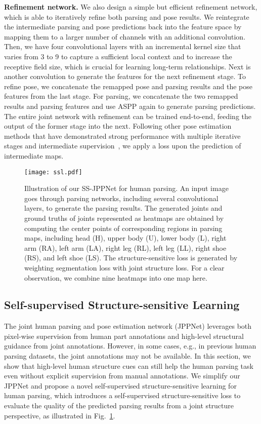\documentclass[10pt,journal,compsoc]{IEEEtran}
\begin{document}
\textbf{Refinement network.}
We also design a simple but efficient refinement network, which is able to iteratively refine both parsing and pose results. We reintegrate the intermediate parsing and pose predictions back into the feature space by mapping them to a larger number of channels with an additional  convolution. Then, we have four convolutional layers with an incremental kernel size that varies from 3 to 9 to capture a sufficient local context and to increase the receptive field size, which is crucial for learning long-term relationships. Next is another  convolution to generate the features for the next refinement stage. To refine pose, we concatenate the remapped pose and parsing results and the pose features from the last stage. For parsing, we concatenate the two remapped results and parsing features and use ASPP again to generate parsing predictions. The entire joint network with refinement can be trained end-to-end, feeding the output of the former stage into the next. Following other pose estimation methods that have demonstrated strong performance with multiple iterative stages and intermediate supervision~\cite{Wei_2016_CVPR,newell2016stacked,carreira2016human}, we apply a loss upon the prediction of intermediate maps.




\begin{figure}[t]
\centering
   \texttt{[image: ssl.pdf]}
\vspace{-7mm}
\caption{Illustration of our SS-JPPNet for human parsing. An input image goes through parsing networks, including several convolutional layers, to generate the parsing results. The generated joints and ground truths of joints represented as heatmaps are obtained by computing the center points of corresponding regions in parsing maps, including head (H), upper body (U), lower body (L), right arm (RA), left arm (LA), right leg (RL), left leg (LL), right shoe (RS), and left shoe (LS). The structure-sensitive loss is generated by weighting segmentation loss with joint structure loss. For a clear observation,  we combine nine heatmaps into one map here.}
\vspace{-2mm}
\label{fig:ss_jppnet}
\end{figure}

\subsection{Self-supervised Structure-sensitive Learning}
The joint human parsing and pose estimation network (JPPNet) leverages both pixel-wise supervision from human part annotations and high-level structural guidance from joint annotations. However, in some cases, e.g., in previous human parsing datasets, the joint annotations may not be available. In this section, we show that high-level human structure cues can still help the human parsing task even without explicit supervision from manual annotations. We simplify our JPPNet and propose a novel self-supervised structure-sensitive learning for human parsing, which introduces a self-supervised structure-sensitive loss to evaluate the quality of the predicted parsing results from a joint structure perspective, as illustrated in Fig.~\ref{fig:ss_jppnet}.
\end{document}

